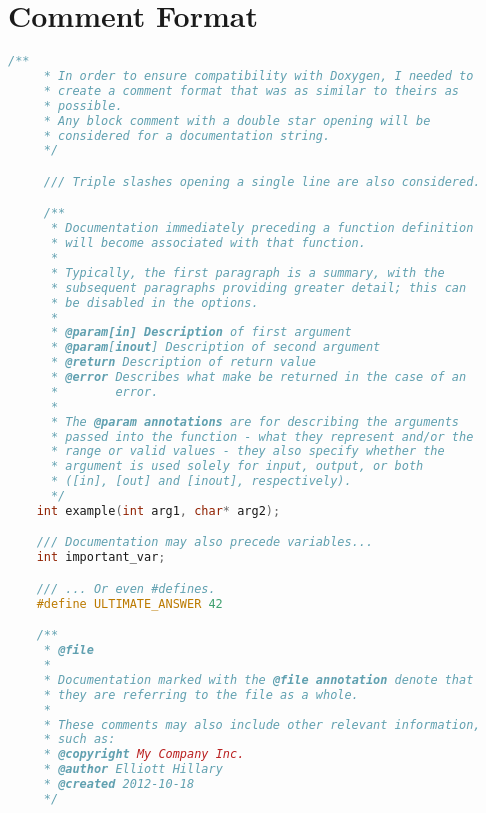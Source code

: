 \chapter{Comment Format}

\begin{lstlisting}[language=c,gobble=4]
    /**
     * In order to ensure compatibility with Doxygen, I needed to
     * create a comment format that was as similar to theirs as
     * possible.
     * Any block comment with a double star opening will be
     * considered for a documentation string.
     */

     /// Triple slashes opening a single line are also considered.

     /**
      * Documentation immediately preceding a function definition
      * will become associated with that function.
      *
      * Typically, the first paragraph is a summary, with the
      * subsequent paragraphs providing greater detail; this can
      * be disabled in the options.
      *
      * @param[in] Description of first argument
      * @param[inout] Description of second argument
      * @return Description of return value
      * @error Describes what make be returned in the case of an
      *        error.
      *
      * The @param annotations are for describing the arguments
      * passed into the function - what they represent and/or the
      * range or valid values - they also specify whether the
      * argument is used solely for input, output, or both
      * ([in], [out] and [inout], respectively).
      */
    int example(int arg1, char* arg2);

    /// Documentation may also precede variables...
    int important_var;

    /// ... Or even #defines.
    #define ULTIMATE_ANSWER 42

    /**
     * @file
     *
     * Documentation marked with the @file annotation denote that
     * they are referring to the file as a whole.
     *
     * These comments may also include other relevant information,
     * such as:
     * @copyright My Company Inc.
     * @author Elliott Hillary
     * @created 2012-10-18
     */
\end{lstlisting}
